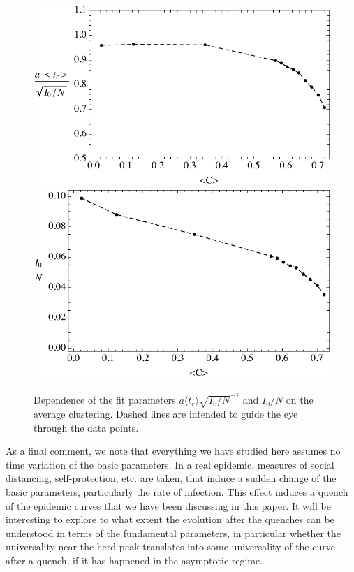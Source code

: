 \documentclass[10pt,letterpaper]{article}
\begin{document}
\begin{figure}[htbp]
\centering
 \hspace{-1.5cm}
 \includegraphics[width=.85\linewidth]{avsC.pdf}\\
 \vspace{0.5cm}
 \includegraphics[width=.8\linewidth]{bvsC.pdf}
\caption{Dependence of the fit parameters $a \langle t_r\rangle \sqrt{I_0/N}^{-1}$ and $I_0/N$ on the average clustering. Dashed lines are intended to guide the eye through the data points.}
\label{fig:aovI0}
\end{figure}

As a final comment, we note that everything we have studied here assumes no time variation of the basic parameters. In a real epidemic, measures  of social distancing, self-protection, etc. are taken, that induce a sudden change of the basic parameters, particularly the rate of infection. This effect induces a quench of the epidemic curves that we have been discussing in this paper. It will be interesting to explore to what extent the evolution after the quenches can be understood in terms of the fundamental parameters, in particular whether the universality near the herd-peak translates into some universality of the curve after a quench, if it has happened in the asymptotic regime. 
\end{document}
